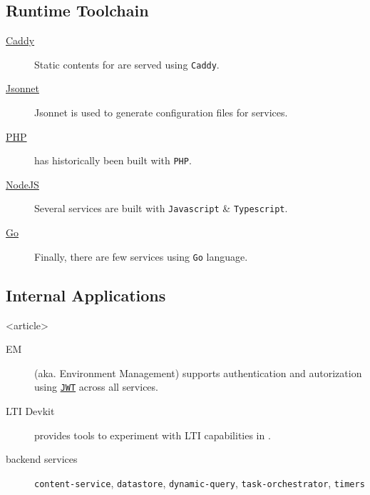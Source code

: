 \subsection{Runtime Toolchain}
\begin{frame}
    \begin{description}
        \item[\href{https://caddyserver.com/}{Caddy}] Static contents for \taoce are served using \texttt{Caddy}.
        \item[\href{https://jsonnet.org/}{Jsonnet}] Jsonnet is used to generate configuration files for \taoce services.
        \item[\href{https://www.php.net/}{PHP}] \taoce has historically been built with \texttt{PHP}. 
        \item[\href{https://nodejs.org/}{NodeJS}] Several services are built with \texttt{Javascript} \& \texttt{Typescript}.
        \item[\href{https://go.dev/}{Go}] Finally, there are few services using \texttt{Go} language.
    \end{description}
\end{frame}

\subsection<article>{Internal Applications}
\begin{frame}<article>
    \begin{description}
        \item[EM] (aka. Environment Management) supports authentication and autorization using \texttt{\href{https://jwt.io/}{JWT}} across all \taoce services.
        \item[LTI Devkit] provides tools to experiment with LTI capabilities in \taoce.
        \item[backend services\notcovered] \scriptsize \texttt{content-service}, \texttt{datastore}, \texttt{dynamic-query}, \texttt{task-orchestrator}, \texttt{timers}
    \end{description}
\end{frame}

